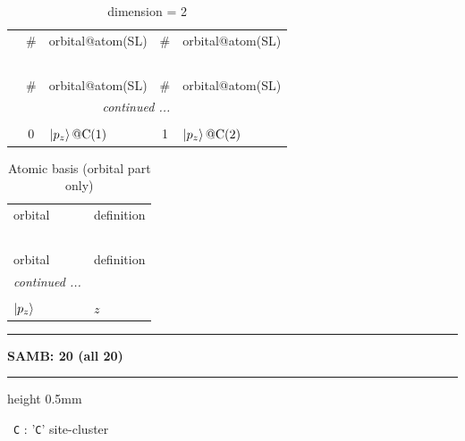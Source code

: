 \documentclass[fleqn,10pt,landscape]{jsarticle}
\begin{document}
\renewcommand{\arraystretch}{1.6}
\begin{longtable}[l]{c|cl|cl}
\captionsetup{justification=raggedright, singlelinecheck=off}
\caption{dimension = 2}
 \\
 \hline \hline
 & \# & orbital@atom(SL) & \# & orbital@atom(SL) \\ \hline \endfirsthead

\multicolumn{4}{l}{\tablename\ \thetable{}} \\
 \hline \hline
 & \# & orbital@atom(SL) & \# & orbital@atom(SL) \\ \hline \endhead

 \hline \hline
\multicolumn{4}{r}{\footnotesize\it continued ...} \\ \endfoot

 \hline \hline
\multicolumn{4}{r}{} \\ \endlastfoot

 & 0 & $\ket{p_{z}}@{\rm C}(1)$ & 1 & $\ket{p_{z}}@{\rm C}(2)$ \\
\end{longtable}
\renewcommand{\arraystretch}{1.6}
\begin{longtable}[l]{ll}
\captionsetup{justification=raggedright, singlelinecheck=off}
\caption{Atomic basis (orbital part only)}
 \\
 \hline \hline
orbital & definition \\ \hline \endfirsthead

\multicolumn{1}{l}{\tablename\ \thetable{}} \\
 \hline \hline
orbital & definition \\ \hline \endhead

 \hline \hline
\multicolumn{1}{r}{\footnotesize\it continued ...} \\ \endfoot

 \hline \hline
\multicolumn{1}{r}{} \\ \endlastfoot

$ \ket{p_{z}} $ & $ z $ \\
\end{longtable}
\vspace{5mm}
\noindent \rule[0.5mm]{5mm}{0.5mm}\hspace{3mm}\textbf{SAMB: 20 (all 20)}\hspace{3mm}\leaders\hrule height 0.5mm\hfill\kern0pt
\vspace{3mm}

\vspace{5mm}

\noindent\textbullet\, \texttt{C} : '\texttt{C}' site-cluster
\end{document}

